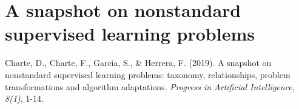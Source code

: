 \documentclass[
	fontsize=11pt, %
	twoside=false, %
	open=any, %
	secnumdepth=1, %
]{kaobook}
\begin{document}
\newcommand{\revised}[1]{#1}


\renewcommand*{\thechapter}{\Roman{chapter}}
\addtocounter{chapter}{2}
\chapter{A snapshot on nonstandard supervised learning problems}

\begin{widepar}
  \begin{kaobox}[frametitle=Source]
    Charte, D., Charte, F., García, S., \& Herrera, F. (2019). A snapshot on nonstandard supervised learning problems: taxonomy, relationships, problem transformations and algorithm adaptations. \textit{Progress in Artificial Intelligence, 8(1)}, 1-14.
  \end{kaobox}
\end{widepar}







\end{document}
